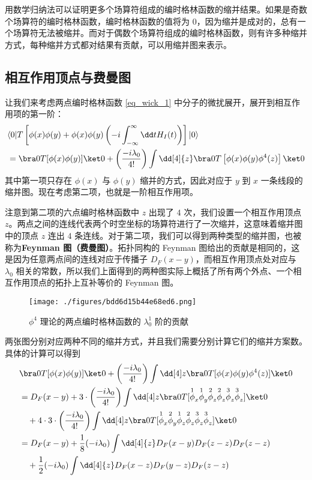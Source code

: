 用数学归纳法可以证明更多个场算符组成的编时格林函数的缩并结果。如果是奇数个场算符的编时格林函数，编时格林函数的值将为 $0$，因为缩并是成对的，总有一个场算符无法被缩并。而对于偶数个场算符组成的编时格林函数，则有许多种缩并方式，每种缩并方式都对结果有贡献，可以用缩并图来表示。
\subsection{相互作用顶点与费曼图}
让我们来考虑两点编时格林函数 \autoref{eq_wick_1} 中分子的微扰展开，展开到相互作用项的第一阶：
\begin{equation}
\begin{aligned}
&\langle 0| T\left[\phi(x)\phi(y)+\phi(x)\phi(y)\left(-i\int_{-\infty}^{\infty}\dd t H_I(t)\right)\right] | 0\rangle\\
&=\bra 0 T[\phi(x)\phi(y)] \ket 0 
+\left(\frac{-i\lambda_0}{4!}\right) \int \dd[4]{z} \bra 0 T\left[ \phi(x)\phi(y)\phi^4(z) \right]\ket 0
\end{aligned}
\end{equation}
其中第一项只存在 $\phi(x)$ 与 $\phi(y)$ 缩并的方式，因此对应于 $y$ 到 $x$ 一条线段的缩并图。现在考虑第二项，也就是一阶相互作用项。

注意到第二项的六点编时格林函数中 $z$ 出现了 $4$ 次，我们设置一个相互作用顶点 $z$。两点之间的连线代表两个时空坐标的场算符进行了一次缩并，这意味着缩并图中的顶点 $z$ 连出 $4$ 条连线。对于第二项，我们可以得到两种类型的缩并图，也被称为\textbf{Feynman 图（费曼图）}。拓扑同构的 Feynman 图给出的贡献是相同的，这是因为任意两点间的连线对应于传播子 $D_F(x-y)$，而相互作用顶点处对应与 $\lambda_0$ 相关的常数，所以我们上面得到的两种图实际上概括了所有两个外点、一个相互作用顶点的拓扑上互补等价的 Feynman 图。

\begin{figure}[ht]
\centering
\texttt{[image: ./figures/bdd6d15b44e68ed6.png]}
\caption{$\phi^4$ 理论的两点编时格林函数的 $\lambda_0^1$ 阶的贡献} \label{fig_wick1}
\end{figure}

两张图分别对应两种不同的缩并方式，并且我们需要分别计算它们的缩并方案数。具体的计算可以得到
\begin{equation}
\begin{aligned}
&\bra 0 T[\phi(x)\phi(y)] \ket 0 
+\left(\frac{-i\lambda_0}{4!}\right) \int \dd[4] z \bra 0 T[\phi(x)\phi(y)\phi^4(z) ]\ket 0\\
&=D_F(x-y)+3\cdot \left(\frac{-i\lambda_0}{4!}\right)\int \dd[4] z 
\bra 0 T [\overset{1}{\phi}_x\overset{1}{\phi}_y \overset{2}{\phi}_z\overset{2}{\phi}_z\overset{3}{\phi}_z \overset{3}{\phi}_z]\ket 0\\
&\quad +4\cdot 3 \cdot \left(\frac{-i\lambda_0}{4!}\right)\int \dd[4] z 
\bra 0 T [\overset{1}{\phi}_x\overset{2}{\phi}_y \overset{1}{\phi}_z\overset{2}{\phi}_z\overset{3}{\phi}_z \overset{3}{\phi}_z]\ket 0\\
&=D_F(x-y)+\frac{1}{8} (-i\lambda_0)\int \dd[4]{z} D_F(x-y)D_F(z-z)D_F(z-z) \\
&\quad + \frac{1}{2} (-i\lambda_0)\int \dd[4]{z} D_F(x-z)D_F(y-z)D_F(z-z)
\end{aligned}
\end{equation}

